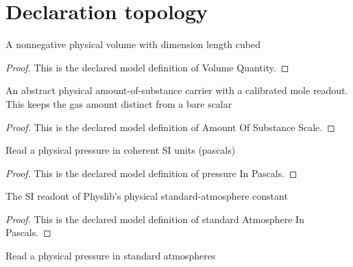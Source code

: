 \section{Declaration topology}
\begin{definition}
  \label{def:physics:phyx-mini-0411:phyxminiproblems-problemphyxmini0411-volumequantity}
  A nonnegative physical volume with dimension length cubed
\end{definition}
\begin{proof}
  This is the declared model definition of Volume Quantity.
\end{proof}
\begin{definition}
  \label{def:physics:phyx-mini-0411:phyxminiproblems-problemphyxmini0411-amountofsubstancescale}
  An abstract physical amount-of-substance carrier with a calibrated mole readout. This keeps the gas amount distinct from a bare scalar
\end{definition}
\begin{proof}
  This is the declared model definition of Amount Of Substance Scale.
\end{proof}
\begin{definition}
  \label{def:physics:phyx-mini-0411:phyxminiproblems-problemphyxmini0411-pressureinpascals}
  Read a physical pressure in coherent SI units (pascals)
\end{definition}
\begin{proof}
  This is the declared model definition of pressure In Pascals.
\end{proof}
\begin{definition}
  \label{def:physics:phyx-mini-0411:phyxminiproblems-problemphyxmini0411-standardatmosphereinpascals}
  The SI readout of Physlib's physical standard-atmosphere constant
\end{definition}
\begin{proof}
  This is the declared model definition of standard Atmosphere In Pascals.
\end{proof}
\begin{definition}
  \label{def:physics:phyx-mini-0411:phyxminiproblems-problemphyxmini0411-pressureinatmospheres}
  Read a physical pressure in standard atmospheres
\end{definition}
